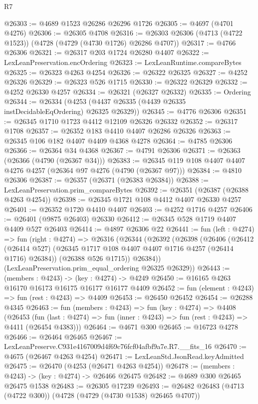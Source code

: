 \begin{lexlean}{R7}
\begin{coremodule}
@26303 := @4689 @1523 @26286 @26296 @1726
@26305 := @4697 (@4701 @4276)
@26306 := @26305 @4708
@26316 := @26303 @26306 (@4713 (@4722 @1523)) (@4728 (@4729 (@4730 @1726) @26286 @4707))
@26317 := @4766 @26306
@26321 := @26317 @203 @1724 @26280 @4407
@26322 := LexLeanPreservation.encOrdering
@26323 := LexLeanRuntime.compareBytes
@26325 := @26323 @4263 @4254
@26326 := @26322 @26325
@26327 := @4252 @26326
@26329 := @26323 @526 @1715
@26330 := @26322 @26329
@26332 := @4252 @26330 @4257
@26334 := @26321 (@26327 @26332)
@26335 := Ordering
@26344 := @26334 (@4253 (@4437 @26335 (@4439 @26335 instDecidableEqOrdering) @26325 @26329))
@26345 := @4776 @26306
@26351 := @26345 @1710 @1723 @4412 @12109 @26326 @26332
@26352 := @26317 @1708
@26357 := @26352 @183 @4410 @4407 @26286 @26326
@26363 := @26345 @106 @182 @4407 @4409 @4368 @4278
@26364 := @4785 @26306
@26366 := @26364 @34 @4368
@26367 := @4791 @26306
@26371 := @26363 (@26366 (@4790 (@26367 @34)))
@26383 := @26345 @119 @108 @4407 @4407 @4276 @4257 (@26364 @97 @4276 (@4790 (@26367 @97)))
@26384 := @4810 @26306
@26387 := @26357 (@26371 (@26383 @26384))
@26388 := LexLeanPreservation.prim_compareBytes
@26392 := @26351 (@26387 (@26388 @4263 @4254))
@26398 := @26345 @1721 @108 @4412 @4407 @26330 @4257
@26401 := @26352 @1720 @4410 @4407
@26403 := @4252 @1716 @4257
@26406 := @26401 (@9875 @26403) @26330
@26412 := @26345 @528 @1719 @4407 @4409 @527 @26403
@26414 := @4897 @26306 @22
@26441 := fun (left : @4274) =>
  fun (right : @4274) =>
  @26316
    (@26344
      (@26392
        (@26398
          (@26406
            (@26412 (@26414 @527) (@26345 @1717 @108 @4407 @4407 @1716 @4257 (@26414 @1716) @26384))
            (@26388 @526 @1715))
          @26384))
      (LexLeanPreservation.prim_equal_ordering @26325 @26329))
@26443 := (members : @4243) -> (key : @4274) -> @4249
@26450 := @16165 @4263 @16170 @16173 @16175 @16177 @16177 @4409
@26452 := fun (element : @4243) => fun (rest : @4243) => @4409
@26453 := @26450 @26452
@26454 := @26288 @4345
@26463 := fun (members : @4243) =>
  fun (key : @4274) =>
  @4408
    (@26453
      (fun (last : @4274) => fun (inner : @4243) => fun (rest : @4243) => @4411 (@26454 @4383)))
@26464 := @4671 @300
@26465 := @16723 @4278
@26466 := @26464 @26465
@26467 := LexLeanPreserve.C931e4167009d4f69c76fcf04afbf9a7e.R7.__fits_16
@26470 := @4675 (@26467 @4263 @4254)
@26471 := LexLeanStd.JsonRead.keyAdmitted
@26475 := @26470 (@4253 (@26471 @4263 @4254))
@26478 := (members : @4243) -> (key : @4274) -> @26466 @26475
@26482 := @4689 @300 @26465 @26475 @1538
@26483 := @26305 @17239
@26493 := @26482 @26483 (@4713 (@4722 @300)) (@4728 (@4729 (@4730 @1538) @26465 @4707))

\end{coremodule}
\end{lexlean}
